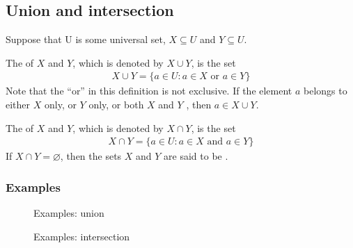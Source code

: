 \documentclass[letterpaper,10pt,english]{jupyterBook}
\begin{document}
\subsection{Union and intersection}
\label{\detokenize{02.sets_numbers_coordinates_distances:union-and-intersection}}
\sphinxAtStartPar
Suppose that U is some universal set, \(X \subseteq U\) and \(Y \subseteq U\).

\sphinxAtStartPar
The  of \(X\) and \(Y\), which is denoted by \(X \cup Y\), is the set
\begin{equation*}
\begin{split}X \cup Y = \{a \in U : a \in X \text{ or } a \in Y\}\end{split}
\end{equation*}
\sphinxAtStartPar
Note that the “or” in this definition is not exclusive. If the element \(a\) belongs to either \(X\) only, or \(Y\) only, or both \(X\) and \(Y\) , then \(a \in X \cup Y\).

\sphinxAtStartPar
The  of \(X\) and \(Y\), which is denoted by \(X \cap Y\), is the set
\begin{equation*}
\begin{split}X \cap Y = \{a \in U : a \in X \text{ and } a \in Y\}\end{split}
\end{equation*}
\sphinxAtStartPar
If \(X \cap Y = \varnothing\), then the sets \(X\) and \(Y\) are said to be .

\sphinxAtStartPar
{}


\subsubsection{Examples}
\label{\detokenize{02.sets_numbers_coordinates_distances:id1}}
\begin{figure}[htbp]
\centering
\capstart

\noindent{}
\caption{Examples: union}\label{\detokenize{02.sets_numbers_coordinates_distances:id4}}\end{figure}

\begin{figure}[htbp]
\centering
\capstart

\noindent{}
\caption{Examples: intersection}\label{\detokenize{02.sets_numbers_coordinates_distances:id5}}\end{figure}
\end{document}
